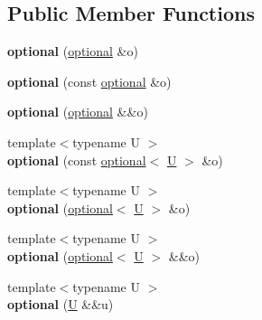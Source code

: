 \subsection*{Public Member Functions}
\begin{DoxyCompactItemize}
\item 
\mbox{\label{classfc_1_1optional_ae51e22870fa597103020e71f3b7cab9e}} 
{\bfseries optional} (\mbox{\hyperlink{classfc_1_1optional}{optional}} \&o)
\item 
\mbox{\label{classfc_1_1optional_af6ddfd3a6c75ab0cd6adc19a651b14b2}} 
{\bfseries optional} (const \mbox{\hyperlink{classfc_1_1optional}{optional}} \&o)
\item 
\mbox{\label{classfc_1_1optional_ae46cc01e5127eb4e5f4d51b9478fd57d}} 
{\bfseries optional} (\mbox{\hyperlink{classfc_1_1optional}{optional}} \&\&o)
\item 
\mbox{\label{classfc_1_1optional_aa1dc774586cb7c4bb1a21c0ecfd865bc}} 
{\footnotesize template$<$typename U $>$ }\\{\bfseries optional} (const \mbox{\hyperlink{classfc_1_1optional}{optional}}$<$ \mbox{\hyperlink{union_u}{U}} $>$ \&o)
\item 
\mbox{\label{classfc_1_1optional_a530439d9ac81883cd74ec9cc8ff74b5a}} 
{\footnotesize template$<$typename U $>$ }\\{\bfseries optional} (\mbox{\hyperlink{classfc_1_1optional}{optional}}$<$ \mbox{\hyperlink{union_u}{U}} $>$ \&o)
\item 
\mbox{\label{classfc_1_1optional_adf7909c2d49c7a1b3ef3f6cf8ad131cc}} 
{\footnotesize template$<$typename U $>$ }\\{\bfseries optional} (\mbox{\hyperlink{classfc_1_1optional}{optional}}$<$ \mbox{\hyperlink{union_u}{U}} $>$ \&\&o)
\item 
\mbox{\label{classfc_1_1optional_a6b6bb3c22caa2bc93fe9c77eb4782a57}} 
{\footnotesize template$<$typename U $>$ }\\{\bfseries optional} (\mbox{\hyperlink{union_u}{U}} \&\&u)
\item 
\mbox{\label{classfc_1_1optional_a22eaa3259adc0d716b5b0aa191836c0d}} 

\end{DoxyCompactItemize}

